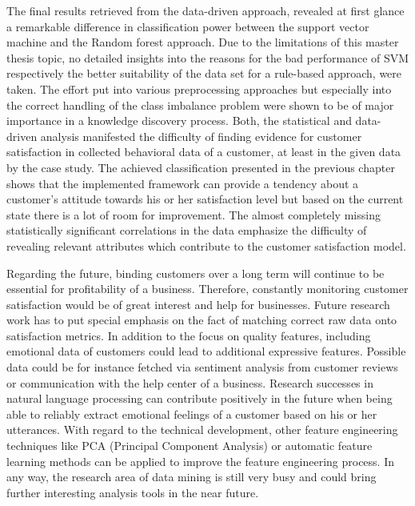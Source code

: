 The final results retrieved from the data-driven approach, revealed at first glance a remarkable difference in classification power between the support vector machine and the Random forest approach. Due to the limitations of this master thesis topic, no detailed insights into the reasons for the bad performance of SVM respectively the better suitability of the data set for a rule-based approach, were taken. The effort put into various preprocessing approaches but especially into the correct handling of the class imbalance problem were shown to be of major importance in a knowledge discovery process. Both, the statistical and data-driven analysis manifested the difficulty of finding evidence for customer satisfaction in collected behavioral data of a customer, at least in the given data by the case study. The achieved classification presented in the previous chapter shows that the implemented framework can provide a tendency about a customer's attitude towards his or her satisfaction level but based on the current state there is a lot of room for improvement. The almost completely missing statistically significant correlations in the data emphasize the difficulty of revealing relevant attributes which contribute to the customer satisfaction model. 

Regarding the future, binding customers over a long term will continue to be essential for profitability of a business. Therefore, constantly monitoring customer satisfaction would be of great interest and help for businesses. Future research work has to put special emphasis on the fact of matching correct raw data onto satisfaction metrics. In addition to the focus on quality features, including emotional data of customers could lead to additional expressive features. Possible data could be for instance fetched via sentiment analysis from customer reviews or communication with the help center of a business. Research successes in natural language processing can contribute positively in the future when being able to reliably extract emotional feelings of a customer based on his or her utterances. With regard to the technical development, other feature engineering techniques like PCA (Principal Component Analysis) or automatic feature learning methods can be applied to improve the feature engineering process. In any way, the research area of data mining is still very busy and could bring further interesting analysis tools in the near future. 